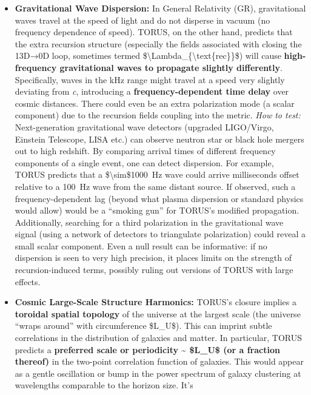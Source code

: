 \documentclass[]{article}
\begin{document}
\begin{itemize}
\item
  \textbf{Gravitational Wave Dispersion:} In General Relativity (GR),
  gravitational waves travel at the speed of light and do not disperse
  in vacuum (no frequency dependence of speed). TORUS, on the other
  hand, predicts that the extra recursion structure (especially the
  fields associated with closing the 13D→0D loop, sometimes termed
  \$\textbackslash{}Lambda\_\{\textbackslash{}text\{rec\}\}\$) will
  cause \textbf{high-frequency gravitational waves to propagate slightly
  differently}​. Specifically, waves in the kHz range might travel at a
  speed very slightly deviating from \emph{c}, introducing a
  \textbf{frequency-dependent time delay} over cosmic distances​. There
  could even be an extra polarization mode (a scalar component) due to
  the recursion fields coupling into the metric. \emph{How to test:}
  Next-generation gravitational wave detectors (upgraded LIGO/Virgo,
  Einstein Telescope, LISA etc.) can observe neutron star or black hole
  mergers out to high redshift. By comparing arrival times of different
  frequency components of a single event, one can detect dispersion. For
  example, TORUS predicts that a \$\textbackslash{}sim\$1000~Hz wave
  could arrive milliseconds offset relative to a 100~Hz wave from the
  same distant source​. If observed, such a frequency-dependent lag
  (beyond what plasma dispersion or standard physics would allow) would
  be a ``smoking gun'' for TORUS's modified propagation. Additionally,
  searching for a third polarization in the gravitational wave signal
  (using a network of detectors to triangulate polarization) could
  reveal a small scalar component​. Even a null result can be
  informative: if no dispersion is seen to very high precision, it
  places limits on the strength of recursion-induced terms, possibly
  ruling out versions of TORUS with large effects.
\item
  \textbf{Cosmic Large-Scale Structure Harmonics:} TORUS's closure
  implies a \textbf{toroidal spatial topology} of the universe at the
  largest scale (the universe ``wraps around'' with circumference
  \$L\_U\$). This can imprint subtle correlations in the distribution of
  galaxies and matter. In particular, TORUS predicts a \textbf{preferred
  scale or periodicity \textasciitilde{} \$L\_U\$ (or a fraction
  thereof)} in the two-point correlation function of galaxies​. This
  would appear as a gentle oscillation or bump in the power spectrum of
  galaxy clustering at wavelengths comparable to the horizon size. It's

\end{itemize}
\end{document}
